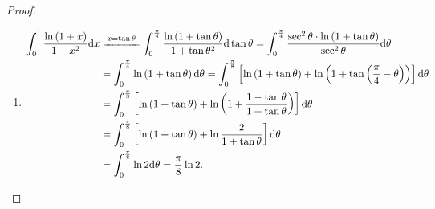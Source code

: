 \documentclass[../../main.tex]{subfiles}
\begin{document}
\begin{proof}
\begin{enumerate}
\item \begin{align*}
\int_0^1{\frac{\ln \left( 1+x \right)}{1+x^2}\mathrm{d}x}&\xlongequal{x=\tan \theta}\int_0^{\frac{\pi}{4}}{\frac{\ln \left( 1+\tan \theta \right)}{1+\tan \theta ^2}\mathrm{d}\tan \theta}=\int_0^{\frac{\pi}{4}}{\frac{\sec ^2\theta \cdot \ln \left( 1+\tan \theta \right)}{\sec ^2\theta}\mathrm{d}\theta}
\\
&=\int_0^{\frac{\pi}{4}}{\ln \left( 1+\tan \theta \right) \mathrm{d}\theta}=\int_0^{\frac{\pi}{8}}{\left[ \ln \left( 1+\tan \theta \right) +\ln \left( 1+\tan \left( \frac{\pi}{4}-\theta \right) \right) \right] \mathrm{d}\theta}
\\
&=\int_0^{\frac{\pi}{8}}{\left[ \ln \left( 1+\tan \theta \right) +\ln \left( 1+\frac{1-\tan \theta}{1+\tan \theta} \right) \right] \mathrm{d}\theta}
\\
&=\int_0^{\frac{\pi}{8}}{\left[ \ln \left( 1+\tan \theta \right) +\ln \frac{2}{1+\tan \theta} \right] \mathrm{d}\theta}
\\
&=\int_0^{\frac{\pi}{8}}{\ln 2\mathrm{d}\theta}=\frac{\pi}{8}\ln 2.
\end{align*} 
\end{enumerate}
\end{proof}
\end{document}
